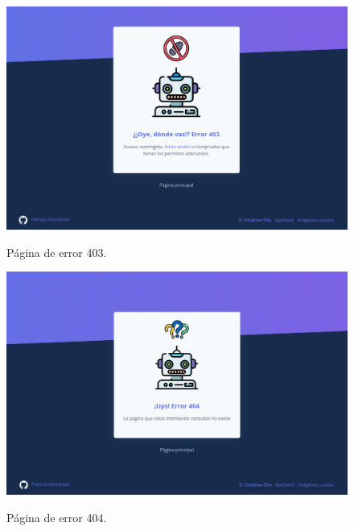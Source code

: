 \begin{figure}[h]
	\caption[Manual de usuario: error 403]{Página de error 403.}
	\centering
	\includegraphics[scale=0.27]{../img/anexos/user_guide/0_error_403}
	\label{e-0:error-403}
\end{figure}

\begin{figure}[h]
	\caption[Manual de usuario: error 404]{Página de error 404.}
	\centering
	\includegraphics[scale=0.27]{../img/anexos/user_guide/0_error_404}
	\label{e-0:error-404}
\end{figure}

